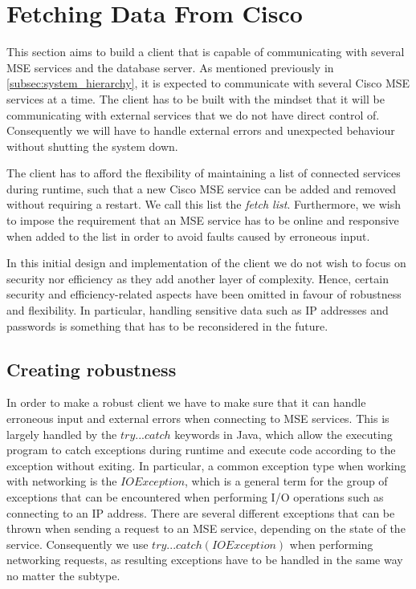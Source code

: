 \section{Fetching Data From Cisco} \label{sec:fetch_data}
This section aims to build a client that is capable of communicating with several MSE services and the database server. As mentioned previously in \cref{subsec:system_hierarchy}, it is expected to communicate with several Cisco MSE services at a time. The client has to be built with the mindset that it will be communicating with external services that we do not have direct control of. Consequently we will have to handle external errors and unexpected behaviour without shutting the system down. 

The client has to afford the flexibility of maintaining a list of connected services during runtime, such that a new Cisco MSE service can be added and removed without requiring a restart. We call this list the \emph{fetch list}. Furthermore, we wish to impose the requirement that an MSE service has to be online and responsive when added to the list in order to avoid faults caused by erroneous input.

In this initial design and implementation of the client we do not wish to focus on security nor efficiency as they add another layer of complexity. Hence, certain security and efficiency-related aspects have been omitted in favour of robustness and flexibility. In particular, handling sensitive data such as IP addresses and passwords is something that has to be reconsidered in the future. %

\subsection*{Creating robustness}
In order to make a robust client we have to make sure that it can handle erroneous input and external errors when connecting to MSE services. This is largely handled by the $try...catch$ keywords in Java, which allow the executing program to catch exceptions during runtime and execute code according to the exception without exiting. In particular, a common exception type when working with networking is the $IOException$, which is a general term for the group of exceptions that can be encountered when performing I/O operations such as connecting to an IP address. There are several different exceptions that can be thrown when sending a request to an MSE service, depending on the state of the service. Consequently we use $try... catch(IOException)$ when performing networking requests, as resulting exceptions have to be handled in the same way no matter the subtype.

